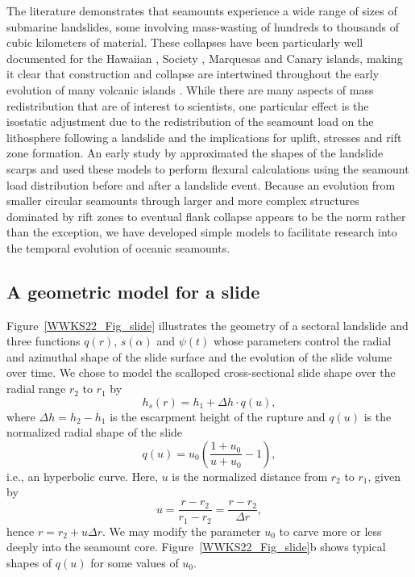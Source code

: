 The literature demonstrates that seamounts experience a wide range of sizes of submarine landslides,
some involving mass-wasting of hundreds to thousands of cubic kilometers of material.  These collapses have been particularly well
documented for the Hawaiian \citep[e.g.,~][]{M1989,M1994}, Society \citep[e.g.,~][]{C2001}, Marquesas \citep[e.g.,~][]{F1994}
and Canary \citep[e.g.,~][]{WM1995,CJC1999} islands, making it clear that construction and collapse are intertwined
throughout the early evolution of many volcanic islands \citep{HJ2017,HJ2020}. While there are many aspects of mass
redistribution that are of interest to scientists, one particular effect is the isostatic adjustment due to the
redistribution of the seamount load on the lithosphere following a landslide and the implications for uplift, stresses and rift zone formation.
An early study by \citet{SW2000} approximated the shapes of the landslide scarps and used
these models to perform flexural calculations using the seamount load distribution before and after a landslide event.
Because an evolution from smaller circular seamounts through larger and more complex structures dominated by rift
zones \citep[e.g.,~][]{M2001} to eventual flank collapse appears to be the norm rather than the exception, we have developed
simple models to facilitate research into the temporal evolution of oceanic seamounts.

\subsection{A geometric model for a slide}

Figure~\ref{WWKS22_Fig_slide} illustrates the geometry of a sectoral landslide and three functions $q(r)$, $s(\alpha)$ and $\psi(t)$ whose
parameters control the radial and azimuthal shape of the slide surface and the evolution of the slide volume over time.
We chose to model the scalloped cross-sectional slide shape over the radial range $r_2$ to $r_1$ by
\begin{equation}
h_s(r) = h_1 + \Delta h \cdot q(u),
\end{equation}
where $\Delta h = h_2 - h_1$ is the escarpment height of the rupture and $q(u)$ is the normalized radial shape
of the slide
\begin{equation}
q(u) = u_0 \left (\frac{1 + u_0}{u + u_0} - 1 \right ),
\end{equation}
i.e., an hyperbolic curve.  Here, $u$ is the normalized distance from $r_2$ to $r_1$, given by
\begin{equation}
u = \frac{r-r_2}{r_1 - r_2} = \frac{r-r_2}{\Delta r},
\end{equation}
hence $r = r_2 + u \Delta r$. We may modify the parameter $u_0$ to carve more or less deeply
into the seamount core. Figure~\ref{WWKS22_Fig_slide}b shows typical shapes of $q(u)$ for some values of $u_0$.

